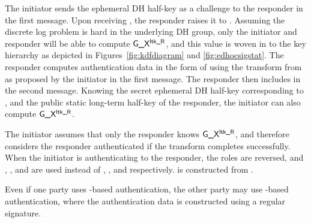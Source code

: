 The initiator sends the ephemeral DH half-key \mGx{} as a challenge to the
responder in the first message.
%
%
Upon receiving \mGx{}, the responder raises it to \mLtkr{}.
%
Assuming the discrete log problem is hard in the underlying DH group,
only the initiator and responder will be able to compute $\textsf{G\_X}{}^{\textsf{ltk\_R}}{}$,
and this value is woven in to the key hierarchy as depicted in
Figures~\ref{fig:kdfdiagram} and \ref{fig:edhocsigstat}.
%
The responder computes authentication data \mAuthr{} in the form of \mMactwo{}
using the \mAead{} transform from \mSuites{} as proposed by the
initiator in the first message.
%
The responder then includes \mMactwo{} in the second message.
%
Knowing the secret ephemeral DH half-key corresponding to \mGx{}, and the public
static long-term half-key of the responder, the initiator can also
compute $\textsf{G\_X}{}^{\textsf{ltk\_R}}{}$.

%
The initiator assumes that only the responder knows $\textsf{G\_X}{}^{\textsf{ltk\_R}}{}$, and
therefore considers the responder authenticated if the \mAead{} transform
completes successfully.
%
When the initiator is authenticating to the responder, the roles are reversed,
and \mGy, \mLtki, and \mAuthi{} are used instead of \mGx, \mLtkr, and \mAuthr{}
respectively. 
\mAuthi{} is constructed from \mMacthree{}.
%

Even if one party uses \mStat{}-based authentication, the
other party may use \mSig{}-based authentication, where the authentication data
is constructed using a regular signature. \\
%
%
 
